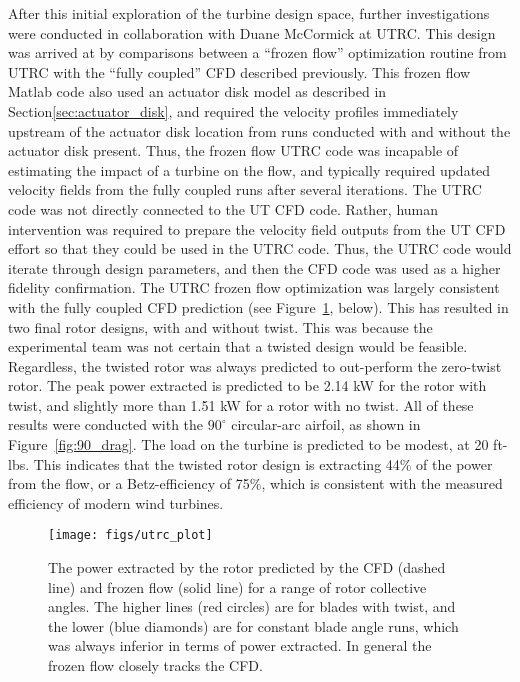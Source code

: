 After this initial exploration of the turbine design space, further
investigations were conducted in collaboration with Duane McCormick at
UTRC. This design was arrived at by comparisons between a ``frozen
flow'' optimization routine from UTRC  with the ``fully coupled'' CFD
described previously. This frozen 
flow Matlab code also used an actuator disk model as described in 
Section\ref{sec:actuator_disk}, and required the velocity profiles
immediately upstream of the actuator disk location from runs conducted
with and without the actuator disk present. Thus, the frozen flow
UTRC code was incapable of estimating the impact of a turbine on the
flow, and typically required updated velocity fields from the fully
coupled runs after several iterations. 
The UTRC code was not directly connected to the UT CFD code. Rather,
human intervention was required to prepare the velocity field outputs
from the UT CFD effort so that they could be used in the UTRC
code. Thus, the UTRC code would iterate through design parameters, and
then the CFD code was used as a higher fidelity confirmation. The UTRC
frozen flow optimization was largely consistent with the fully coupled
CFD prediction (see  Figure~\ref{fig:UTRC_turbine}, below). This has
resulted in two final rotor designs, with and without twist. This was
because the experimental team was not certain that a twisted design
would be feasible. Regardless, the twisted rotor was always predicted to 
out-perform the zero-twist rotor.  
The peak power extracted is predicted to be 2.14 kW for the rotor
with twist, and slightly more than 1.51 kW for a rotor with no twist. 
All of these results were conducted with the $90^{\circ}$ circular-arc
airfoil, as shown in Figure~\ref{fig:90_drag}. The load on the turbine
is predicted to be modest, at 20 ft-lbs. This indicates that the twisted
rotor design is extracting 44\% of the power from the flow, or a
Betz-efficiency of 75\%, which is consistent with the measured
efficiency of modern wind turbines. 

  \begin{figure}[!htb]
   \begin{center}
    \texttt{[image: figs/utrc\_plot]}
    \caption{The power extracted by the rotor predicted by the CFD
    (dashed line) and frozen flow (solid line) for a range of rotor
    collective angles. The higher lines (red circles) are for blades
    with twist, and the lower (blue diamonds) are for constant blade
    angle runs, which was always  inferior in terms of power
    extracted. In general the frozen flow closely tracks the CFD.}
    \label{fig:UTRC_turbine}
   \end{center}
  \end{figure}

